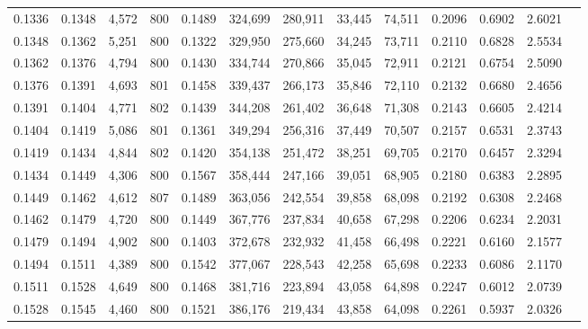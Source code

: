 \begin{tabular}{rrrrrrrrrrrrr}
0.1336 & 0.1348 &  4,572 & 800 &                                     0.1489 & 324,699 & 280,911 &  33,445 &  74,511 & 0.2096 & 0.6902 & 2.6021 \\
0.1348 & 0.1362 &  5,251 & 800 &                                     0.1322 & 329,950 & 275,660 &  34,245 &  73,711 & 0.2110 & 0.6828 & 2.5534 \\
0.1362 & 0.1376 &  4,794 & 800 &                                     0.1430 & 334,744 & 270,866 &  35,045 &  72,911 & 0.2121 & 0.6754 & 2.5090 \\
0.1376 & 0.1391 &  4,693 & 801 &                                     0.1458 & 339,437 & 266,173 &  35,846 &  72,110 & 0.2132 & 0.6680 & 2.4656 \\
0.1391 & 0.1404 &  4,771 & 802 &                                     0.1439 & 344,208 & 261,402 &  36,648 &  71,308 & 0.2143 & 0.6605 & 2.4214 \\
0.1404 & 0.1419 &  5,086 & 801 &                                     0.1361 & 349,294 & 256,316 &  37,449 &  70,507 & 0.2157 & 0.6531 & 2.3743 \\
0.1419 & 0.1434 &  4,844 & 802 &                                     0.1420 & 354,138 & 251,472 &  38,251 &  69,705 & 0.2170 & 0.6457 & 2.3294 \\
0.1434 & 0.1449 &  4,306 & 800 &                                     0.1567 & 358,444 & 247,166 &  39,051 &  68,905 & 0.2180 & 0.6383 & 2.2895 \\
0.1449 & 0.1462 &  4,612 & 807 &                                     0.1489 & 363,056 & 242,554 &  39,858 &  68,098 & 0.2192 & 0.6308 & 2.2468 \\
0.1462 & 0.1479 &  4,720 & 800 &                                     0.1449 & 367,776 & 237,834 &  40,658 &  67,298 & 0.2206 & 0.6234 & 2.2031 \\
0.1479 & 0.1494 &  4,902 & 800 &                                     0.1403 & 372,678 & 232,932 &  41,458 &  66,498 & 0.2221 & 0.6160 & 2.1577 \\
0.1494 & 0.1511 &  4,389 & 800 &                                     0.1542 & 377,067 & 228,543 &  42,258 &  65,698 & 0.2233 & 0.6086 & 2.1170 \\
0.1511 & 0.1528 &  4,649 & 800 &                                     0.1468 & 381,716 & 223,894 &  43,058 &  64,898 & 0.2247 & 0.6012 & 2.0739 \\
0.1528 & 0.1545 &  4,460 & 800 &                                     0.1521 & 386,176 & 219,434 &  43,858 &  64,098 & 0.2261 & 0.5937 & 2.0326 \\

\end{tabular}
